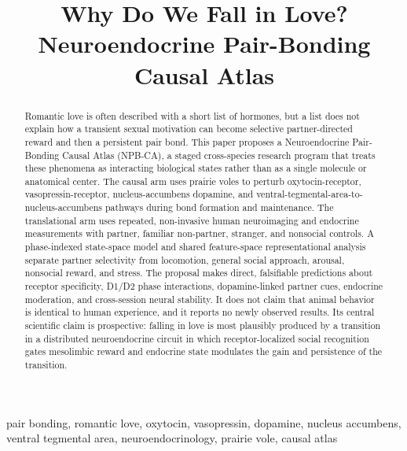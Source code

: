 \documentclass[conference]{IEEEtran}
\begin{document}
\title{Why Do We Fall in Love?\\
Neuroendocrine Pair-Bonding Causal Atlas}

\author{
}

\maketitle

\begin{abstract}
Romantic love is often described with a short list of hormones, but a list does not explain how a transient sexual motivation can become selective partner-directed reward and then a persistent pair bond. This paper proposes a Neuroendocrine Pair-Bonding Causal Atlas (NPB-CA), a staged cross-species research program that treats these phenomena as interacting biological states rather than as a single molecule or anatomical center. The causal arm uses prairie voles to perturb oxytocin-receptor, vasopressin-receptor, nucleus-accumbens dopamine, and ventral-tegmental-area-to-nucleus-accumbens pathways during bond formation and maintenance. The translational arm uses repeated, non-invasive human neuroimaging and endocrine measurements with partner, familiar non-partner, stranger, and nonsocial controls. A phase-indexed state-space model and shared feature-space representational analysis separate partner selectivity from locomotion, general social approach, arousal, nonsocial reward, and stress. The proposal makes direct, falsifiable predictions about receptor specificity, D1/D2 phase interactions, dopamine-linked partner cues, endocrine moderation, and cross-session neural stability. It does not claim that animal behavior is identical to human experience, and it reports no newly observed results. Its central scientific claim is prospective: falling in love is most plausibly produced by a transition in a distributed neuroendocrine circuit in which receptor-localized social recognition gates mesolimbic reward and endocrine state modulates the gain and persistence of the transition.
\end{abstract}

\begin{IEEEkeywords}
pair bonding, romantic love, oxytocin, vasopressin, dopamine, nucleus accumbens, ventral tegmental area, neuroendocrinology, prairie vole, causal atlas
\end{IEEEkeywords}
\end{document}
